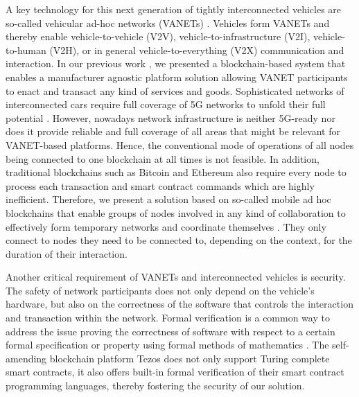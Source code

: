 \documentclass{llncs}
\begin{document}
{		A key technology for this next generation of tightly interconnected vehicles are so-called vehicular ad-hoc networks (VANETs) \cite{toh2001ad}. Vehicles form VANETs and thereby enable vehicle-to-vehicle (V2V), vehicle-to-infrastructure (V2I), vehicle-to-human (V2H), or in general vehicle-to-everything (V2X) communication and interaction. In our previous work \cite{chorusWhitepaper}\cite{chorus2018MCIS}, we presented a blockchain-based system that enables a manufacturer agnostic platform solution allowing VANET participants to enact and transact any kind of services and goods. Sophisticated networks of interconnected cars require full coverage of 5G networks to unfold their full potential \cite{anwer2014survey}\cite{chiti2017communications}\cite{mitra20155g}. However, nowadays network infrastructure is neither 5G-ready nor does it provide reliable and full coverage of all areas that might be relevant for VANET-based platforms. Hence, the conventional mode of operations of all nodes being connected to one blockchain at all times is not feasible. In addition, traditional blockchains such as Bitcoin \cite{nakamoto_bitcoin:2008} and Ethereum \cite{wood2014ethereum} also require every node to process each transaction and smart contract commands which are highly inefficient. Therefore, we present a solution based on so-called mobile ad hoc blockchains that enable groups of nodes involved in any kind of collaboration to effectively form temporary networks and coordinate themselves \cite{monetWhitepaper}. They only connect to nodes they need to be connected to, depending on the context, for the duration of their interaction.
		
		Another critical requirement of VANETs and interconnected vehicles is security. The safety of network participants does not only depend on the vehicle's hardware, but also on the correctness of the software that controls the interaction and transaction within the network. Formal verification is a common way to address the issue proving the correctness of software with respect to a certain formal specification or property using formal methods of mathematics \cite{wing1990specifier}. The self-amending blockchain platform Tezos \cite{tezosWhitepaper} does not only support Turing complete smart contracts, it also offers built-in formal verification of their smart contract programming languages, thereby fostering the security of our solution.




}
\end{document}
